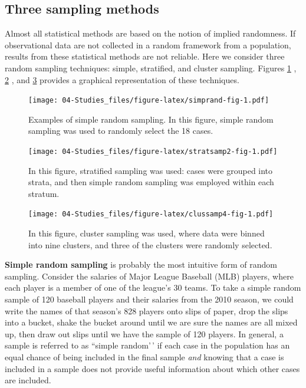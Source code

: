 \documentclass[
]{book}
\begin{document}
\hypertarget{three-sampling-methods}{%
\subsection{Three sampling methods}\label{three-sampling-methods}}

Almost all statistical methods are based on the notion of implied randomness. If observational data are not collected in a random framework from a population, results from these statistical methods are not reliable. Here we consider three random sampling techniques: simple, stratified, and cluster sampling. Figures \ref{fig:simprand-fig} , \ref{fig:stratsamp2-fig} , and \ref{fig:clussamp4-fig} provides a graphical representation of these techniques.

\begin{figure}
\centering
\texttt{[image: 04-Studies\_files/figure-latex/simprand-fig-1.pdf]}
\caption{\label{fig:simprand-fig}Examples of simple random sampling. In this figure, simple random sampling was used to randomly select the 18 cases.}
\end{figure}

\begin{figure}
\centering
\texttt{[image: 04-Studies\_files/figure-latex/stratsamp2-fig-1.pdf]}
\caption{\label{fig:stratsamp2-fig}In this figure, stratified sampling was used: cases were grouped into strata, and then simple random sampling was employed within each stratum.}
\end{figure}

\begin{figure}
\centering
\texttt{[image: 04-Studies\_files/figure-latex/clussamp4-fig-1.pdf]}
\caption{\label{fig:clussamp4-fig}In this figure, cluster sampling was used, where data were binned into nine clusters, and three of the clusters were randomly selected.}
\end{figure}

\textbf{Simple random sampling} is probably the most intuitive form of random sampling. Consider the salaries of Major League Baseball (MLB) players, where each player is a member of one of the league's 30 teams. To take a simple random sample of 120 baseball players and their salaries from the 2010 season, we could write the names of that season's 828 players onto slips of paper, drop the slips into a bucket, shake the bucket around until we are sure the names are all mixed up, then draw out slips until we have the sample of 120 players. In general, a sample is referred to as ``simple random'\,' if each case in the population has an equal chance of being included in the final sample \emph{and} knowing that a case is included in a sample does not provide useful information about which other cases are included.
\end{document}
